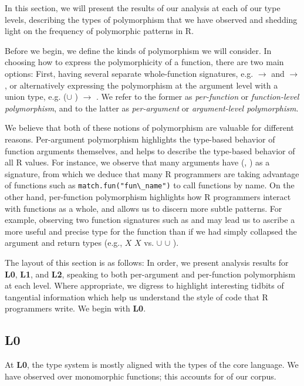 \documentclass[acmsmall,10pt,review,anonymous]{acmart}\settopmatter{printfolios=true,printccs=false,printacmref=false}
\newcommand{\code}[1]{\lstinline|#1|\xspace}
\begin{document}
In this section, we will present the results of our analysis at each of our type levels, describing the types of polymorphism that we have observed and shedding light on the frequency of polymorphic patterns in R.

Before we begin, we define the kinds of polymorphism we will consider.
In choosing how to express the polymorphicity of a function, there are two main options:
First, having several separate whole-function signatures, e.g. \D $\rightarrow$ \D and \C $\rightarrow$ \D, or alternatively expressing the polymorphism at the argument level with a union type, e.g. (\D $\cup$ \C) $\rightarrow$ \C.
We refer to the former as {\it per-function} or {\it function-level polymorphism}, and to the latter as {\it per-argument} or {\it argument-level polymorphism}.

We believe that both of these notions of polymorphism are valuable for different reasons.
Per-argument polymorphism highlights the type-based behavior of function arguments themselves, and helps to describe the type-based behavior of all R values.
For instance, we observe that many arguments have (\sC, \sF) as a signature, from which we deduce that many R programmers are taking advantage of functions such as \code{match.fun("fun\_name")} to call functions by name.
On the other hand, per-function polymorphism highlights how R programmers interact with functions as a whole, and allows us to discern more subtle patterns.
For example, observing two function signatures such as \D \to \D and \sF \to \sF may lead us to ascribe a more useful and precise type for the function than if we had simply collapsed the argument and return types (e.g., $X$ \to $X$ vs. \D $\cup$ \sF \to \D $\cup$ \sF).

The layout of this section is as follows:
In order, we present analysis results for {\bf L0}, {\bf L1}, and {\bf L2}, speaking to both per-argument and per-function polymorphism at each level.
Where appropriate, we digress to highlight interesting tidbits of tangential information which help us understand the style of code that R programmers write.
We begin with {\bf L0}.

\subsection{L0}

At {\bf L0}, the type system is mostly aligned with the types of the core language.  We
have observed over  monomorphic functions; this accounts for  of our
corpus. 
\end{document}
